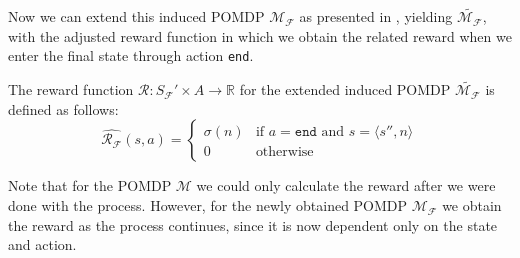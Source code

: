 Now we can extend this induced POMDP $\mathcal{M}_\mathcal{F}$ as presented in , yielding $\widetilde{\mathcal{M}_\mathcal{F}}$, with the adjusted reward function in which we obtain the related reward when we enter the final state through action \texttt{end}.

\begin{definition}
	\label{d:reward-fuction-extended-induced-pomdp}
	The reward function $\mathcal{R}:S_\mathcal{F}'\times A\to \mathbb{R}$ for the extended induced POMDP $\widetilde{\mathcal{M}_{\mathcal{F}}}$ is defined as follows:
	\[\widehat{\mathcal{R}_\mathcal{F}}(s,a) = \begin{cases}
		\sigma(n) & \text{if } a=\texttt{end} \text{ and } s=\langle s'',n\rangle \\
		0 & \text{otherwise} 
		\end{cases}
	\]
\end{definition}

Note that for the POMDP $\mathcal{M}$ we could only calculate the reward after we were done with the process. However, for the newly obtained POMDP $\mathcal{M}_{\mathcal{F}}$ we obtain the reward as the process continues, since it is now dependent only on the state and action.

